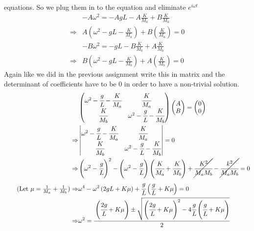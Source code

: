 \documentclass[addpoints]{exam}
\begin{document}
\begin{questions}
\begin{solution}
   equations. So we plug them in to the equation and eliminate $e^{i\omega t}$
   \begin{align*}
       \tag{for mass $M_a$}
        &-A\omega^2 = -A{g}{L}- A\frac{K}{M_a}+B\frac{K}{M_a}\\
        \Rightarrow&A\left(\omega^2 -{g}{L}- \frac{K}{M_a}\right)+B\left(\frac{K}{M_a}\right) = 0\\
        \tag{for mass $M_b$} 
        &-B\omega^2 = -{g}{L}- B\frac{K}{M_b} +A\frac{K}{M_b}\\
        \Rightarrow&B\left(\omega^2 -{g}{L}- \frac{K}{M_b}\right)+A\left(\frac{K}{M_b}\right) = 0
   \end{align*} 
   Again like we did in the previous assignment write this in matrix and the determinant of coefficients have to be 0 in order to have a non-trivial solution.
   \begin{align*}
        &\begin{pmatrix}
            \omega ^{2} -\cfrac{g}{L} -\cfrac{K}{M_{a}} & \cfrac{K}{M_{a}}\\
            \cfrac{K}{M_{b}} & \omega ^{2} -\cfrac{g}{L} -\cfrac{K}{M_{b}}
            \end{pmatrix}\begin{pmatrix}
            A\\
            B
            \end{pmatrix} =\begin{pmatrix}
            0\\
            0
            \end{pmatrix}\\ 
        \Rightarrow& 
        \begin{vmatrix}
            \omega ^{2} -\cfrac{g}{L} -\cfrac{K}{M_{a}} & \cfrac{K}{M_{a}}\\
            \cfrac{K}{M_{b}} & \omega ^{2} -\cfrac{g}{L} -\cfrac{K}{M_{b}} 
        \end{vmatrix} = 0\\ 
        \Rightarrow& \left(\omega^2-\cfrac{g}{L}\right)^2-\left(\omega^2-\cfrac{g}{L}\right)\left(\cfrac{K}{M_a}+\cfrac{K}{M_b}\right) +\cancel{\cfrac{K^2}{M_aM_b}}- \cancel{\cfrac{k^2}{M_aM_b}} = 0 \\ 
        \tag{Let $\mu = \frac{1}{M_a}+\frac{1}{M_b}$}
        \Rightarrow& \omega^4 - \omega^2\left({2g}{L}+K\mu\right)+\cfrac{g}{L}\left(\frac{g}{L}+K\mu\right) =0 \\ 
        \Rightarrow& \omega^2 = \cfrac{\left(\cfrac{2g}{L}+K\mu\right)\pm \sqrt{\left(\cfrac{2g}{L}+K\mu\right)^2 - 4\cfrac{g}{L}\left(\cfrac{g}{L}+K\mu\right) }}{2}\\ 

\end{align*}
\end{solution}
\end{questions}
\end{document}
